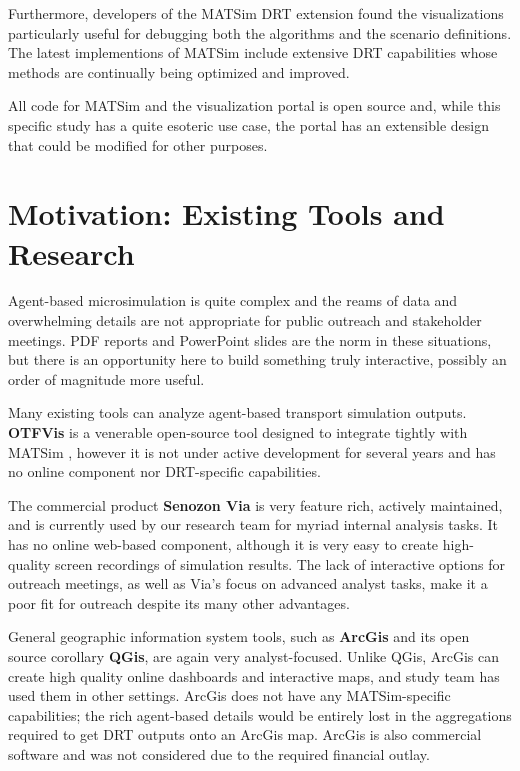 \documentclass[3p,times,procedia]{elsarticle}
\begin{document}
Furthermore, developers of the MATSim DRT extension found the visualizations particularly useful for debugging both the algorithms and the scenario definitions. The latest implementions of MATSim include extensive DRT capabilities whose methods are continually being optimized and improved.

All code for MATSim and the visualization portal is open source and, while this specific study has a quite esoteric use case, the portal has an extensible design that could be modified for other purposes.

\section{Motivation: Existing Tools and Research}
\label{motivation}

Agent-based microsimulation is quite complex and the reams of data and overwhelming details are not appropriate for public outreach and stakeholder meetings. PDF reports and PowerPoint slides are the norm in these situations, but there is an opportunity here to build something truly interactive, possibly an order of magnitude more useful.

Many existing tools can analyze agent-based transport simulation outputs. \textbf{OTFVis} is a venerable open-source tool designed to integrate tightly with MATSim \cite{Srippgen2015OTFVisInBook}, however it is not under active development for several years and has no online component nor DRT-specific capabilities.

The commercial product \textbf{Senozon Via} \cite{Rieser2015SenozonViaInBook} is very feature rich, actively maintained, and is currently used by our research team for myriad internal analysis tasks. It has no online web-based component, although it is very easy to create high-quality screen recordings of simulation results. The lack of interactive options for outreach meetings, as well as Via's focus on advanced analyst tasks, make it a poor fit for outreach despite its many other advantages.

General geographic information system tools, such as \textbf{ArcGis} and its open source corollary \textbf{QGis}, are again very analyst-focused. Unlike QGis, ArcGis can create high quality online dashboards and interactive maps, and study team has used them in other settings. ArcGis does not have any MATSim-specific capabilities; the rich agent-based details would be entirely lost in the aggregations required to get DRT outputs onto an ArcGis map. ArcGis is also commercial software and was not considered due to the required financial outlay.
\end{document}
